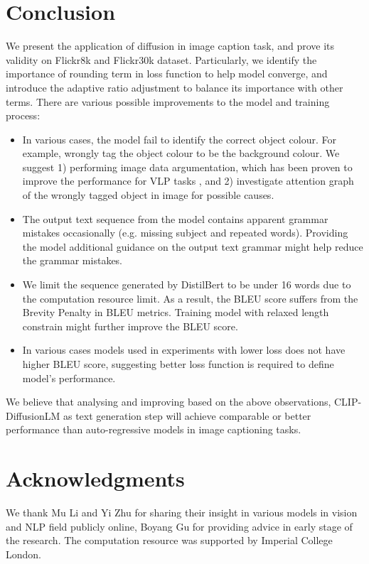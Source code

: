 \documentclass{article}
\begin{document}
\section{Conclusion}
We present the application of diffusion in image caption task, and prove its validity on Flickr8k and Flickr30k dataset. Particularly, we identify the importance of rounding term in loss function to help model converge, and introduce the adaptive ratio adjustment to balance its importance with other terms. There are various possible improvements to the model and training process:
\begin{itemize}
\item In various cases, the model fail to identify the correct object colour. For example, wrongly tag the object colour to be the background colour. We suggest 1) performing image data argumentation, which has been proven to improve the performance for VLP tasks \cite{vilt}, and 2) investigate attention graph of the wrongly tagged object in image for possible causes.
\item The output text sequence from the model contains apparent grammar mistakes occasionally (e.g. missing subject and repeated words). Providing the model additional guidance on the output text grammar might help reduce the grammar mistakes.
\item We limit the sequence generated by DistilBert to be under 16 words due to the computation resource limit. As a result, the BLEU score suffers from the Brevity Penalty in BLEU metrics. Training model with relaxed length constrain might further improve the BLEU score.
\item In various cases models used in experiments with lower loss does not have higher BLEU score, suggesting better loss function is required to define model's performance.
\end{itemize}
We believe that analysing and improving based on the above observations, CLIP-DiffusionLM as text generation step will achieve comparable or better performance than auto-regressive models in image captioning tasks.

\section*{Acknowledgments}
We thank Mu Li and Yi Zhu for sharing their insight in various models in vision and NLP field publicly online, Boyang Gu for providing advice in early stage of the research. The computation resource was supported by Imperial College London. 

  
  
\end{document}
